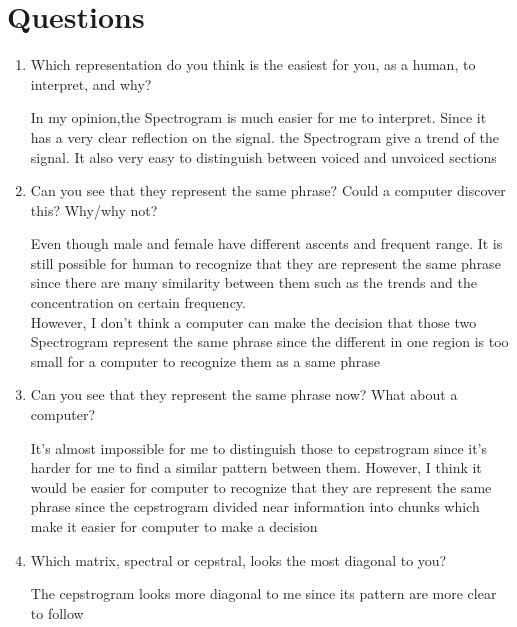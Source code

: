 \documentclass{article}
\begin{document}
    \section{Questions}
    \begin{enumerate}[label=\alph*)]
        \item Which representation do you think is the easiest for you, as a human, to interpret, and why?
        \begin{adjustwidth}{2em}{0pt}
            In my opinion,the Spectrogram is much easier for me to interpret. Since it has a very clear reflection on the signal.
            the Spectrogram give a trend of the signal. It also very easy to distinguish between voiced and unvoiced sections
        \end{adjustwidth}
        \item Can you see that they represent the same phrase? Could a computer discover this? Why/why not?
        \begin{adjustwidth}{2em}{0pt}
            Even though male and female have different ascents and frequent range. It is still
            possible for human to recognize that they are represent the same phrase since there are many
            similarity between them such as the trends and the concentration on certain frequency. \\
            However, I don't think a computer can make the decision that those two Spectrogram represent the
            same phrase since the different in one region is too small for a computer to recognize
            them as a same phrase
        \end{adjustwidth}
        \item Can you see that they represent the same phrase now? What about a computer?
        \begin{adjustwidth}{2em}{0pt}
            It's almost impossible for me to distinguish those to cepstrogram since it's harder for me
            to find a similar pattern between them. However, I think it would be easier for computer to
            recognize that they are represent the same phrase since the cepstrogram divided near information
            into chunks which make it easier for computer to make a decision
        \end{adjustwidth}
        \item Which matrix, spectral or cepstral, looks the most diagonal to you?
        \begin{adjustwidth}{2em}{0pt}
            The cepstrogram looks more diagonal to me since its pattern are more clear to follow
        \end{adjustwidth}
    \end{enumerate}
\end{document}
